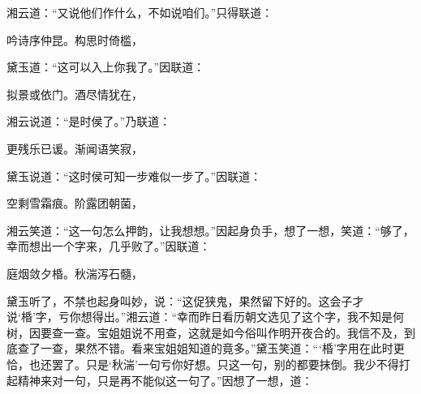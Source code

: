 \begin{parag}
    湘云道：“又说他们作什么，不如说咱们。”只得联道：
\end{parag}


\begin{poem}
    \begin{pl}吟诗序仲昆。构思时倚槛，\end{pl}
\end{poem}


\begin{parag}
    黛玉道：“这可以入上你我了。”因联道：
\end{parag}


\begin{poem}
    \begin{pl}拟景或依门。酒尽情犹在，\end{pl}
\end{poem}


\begin{parag}
    湘云说道：“是时侯了。”乃联道：
\end{parag}


\begin{poem}
    \begin{pl}更残乐已谖。渐闻语笑寂，\end{pl}
\end{poem}


\begin{parag}
    黛玉说道：“这时侯可知一步难似一步了。”因联道：
\end{parag}


\begin{poem}
    \begin{pl}空剩雪霜痕。阶露团朝菌，\end{pl}
\end{poem}


\begin{parag}
    湘云笑道：“这一句怎么押韵，让我想想。”因起身负手，想了一想，笑道：“够了，幸而想出一个字来，几乎败了。”因联道：
\end{parag}


\begin{poem}
    \begin{pl}庭烟敛夕棔。秋湍泻石髓，\end{pl}
\end{poem}


\begin{parag}
    黛玉听了，不禁也起身叫妙，说：“这促狭鬼，果然留下好的。这会子才说‘棔’字，亏你想得出。”湘云道：“幸而昨日看历朝文选见了这个字，我不知是何树，因要查一查。宝姐姐说不用查，这就是如今俗叫作明开夜合的。我信不及，到底查了一查，果然不错。看来宝姐姐知道的竟多。”黛玉笑道：“‘棔’字用在此时更恰，也还罢了。只是‘秋湍’一句亏你好想。只这一句，别的都要抹倒。我少不得打起精神来对一句，只是再不能似这一句了。”因想了一想，道：
\end{parag}


